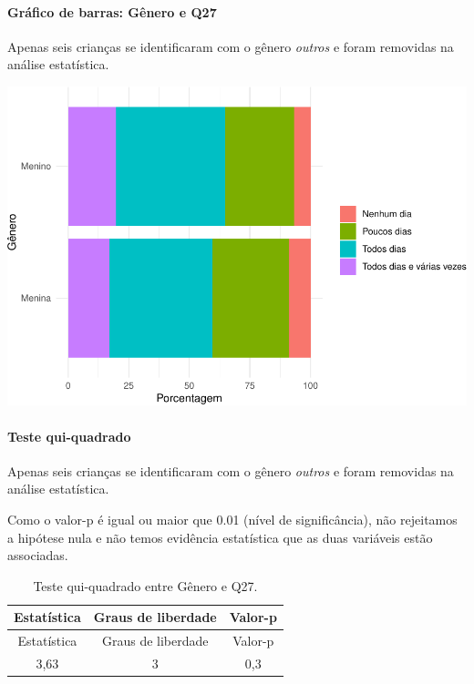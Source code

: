 \documentclass[]{article}
\let\oldparagraph\paragraph
\renewcommand{\paragraph}[1]{\oldparagraph{#1}\mbox{}}
\begin{document}
\hypertarget{gruxe1fico-de-barras-guxeanero-e-q27}{%
\paragraph{Gráfico de barras: Gênero e Q27}\label{gruxe1fico-de-barras-guxeanero-e-q27}}

Apenas seis crianças se identificaram com o gênero \emph{outros} e foram removidas na análise estatística.

\begin{center}\includegraphics[width=0.75\linewidth]{relatorio_covid19_files/figure-latex/unnamed-chunk-790-1} \end{center}

\hypertarget{teste-qui-quadrado-68}{%
\paragraph{Teste qui-quadrado}\label{teste-qui-quadrado-68}}

Apenas seis crianças se identificaram com o gênero \emph{outros} e foram removidas na análise estatística.

Como o valor-p é igual ou maior que 0.01 (nível de significância), não rejeitamos a hipótese nula e não temos evidência estatística que as duas variáveis estão associadas.

\begin{longtable}[]{@{}ccc@{}}
\caption{\label{tab:unnamed-chunk-792}Teste qui-quadrado entre Gênero e Q27.}\tabularnewline
\toprule
Estatística & Graus de liberdade & Valor-p\tabularnewline
\midrule
\endfirsthead
\toprule
Estatística & Graus de liberdade & Valor-p\tabularnewline
\midrule
\endhead
3,63 & 3 & 0,3\tabularnewline
\bottomrule
\end{longtable}

\cleardoublepage
\end{document}

